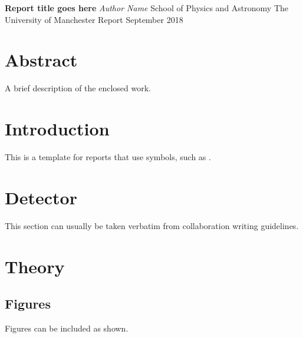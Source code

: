 \documentclass[a4paper]{article}
\begin{document}
\begin{center}
\Huge{\bf Report title goes here} \vskip 40pt
\normalsize{\emph{Author Name}}\vskip 20pt
School of Physics and Astronomy\vskip 2pt
The University of Manchester\vskip 20pt
Report\vskip 20pt
September 2018\vskip 20pt

\end{center}\vskip 96pt





\section*{Abstract}
\label{sec:abstract}
A brief description of the enclosed work.
\vskip 64pt


\tableofcontents


\clearpage %





\section{Introduction}
\label{sec:introduction}
This is a template for reports that use \lhcb symbols, such as \DFourpi.





\section{Detector}
\label{sec:detector}
This section can usually be taken verbatim from \lhcb collaboration writing guidelines.





\section{Theory}
\label{sec:theory}



\subsection{Figures}
\label{sec:theory_figures}
Figures can be included as shown.
\end{document}
